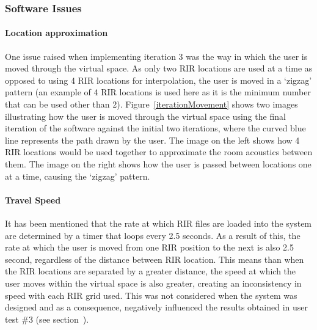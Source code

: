 \documentclass[../../main.tex]{subfiles}
\begin{document}
		\subsubsection{Software Issues}
	\label{iteration3Issues}

		\paragraph{Location approximation}
		One issue raised when implementing iteration 3 was the way in which the user is moved through the virtual space. As only two \ac{RIR} locations are used at a time as opposed to using 4 \ac{RIR} locations for interpolation, the user is moved in a `zigzag' pattern (an example of 4 \ac{RIR} locations is used here as it is the minimum number that can be used other than 2). Figure~\ref{iterationMovement} shows two images illustrating how the user is moved through the virtual space using the final iteration of the software against the initial two iterations, where the curved blue line represents the path drawn by the user. The image on the left shows how 4 \ac{RIR} locations would be used together to approximate the room acoustics between them. The image on the right shows how the user is passed between locations one at a time, causing the `zigzag' pattern.

		\paragraph{Travel Speed}

		It has been mentioned that the rate at which \ac{RIR} files are loaded into the system are determined by a timer that loops every 2.5 seconds. As a result of this, the rate at which the user is moved from one \ac{RIR} position to the next is also 2.5 second, regardless of the distance between \ac{RIR} location. This means than when the \ac{RIR} locations are separated by a greater distance, the speed at which the user moves within the virtual space is also greater, creating an inconsistency in speed with each \ac{RIR} grid used. This was not considered when the system was designed and as a consequence, negatively influenced the results obtained in user test \#3 (see section~).
\end{document}
